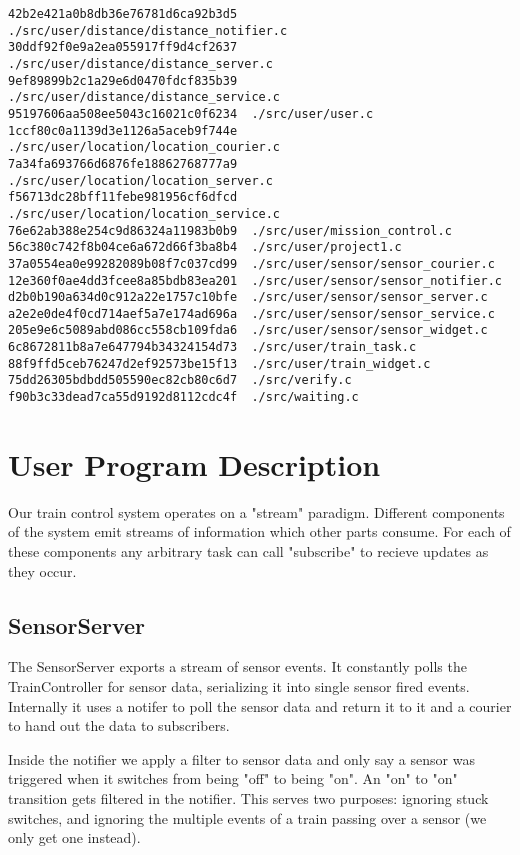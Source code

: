 \documentclass{article}
\begin{document}
\begin{verbatim}
42b2e421a0b8db36e76781d6ca92b3d5  ./src/user/distance/distance_notifier.c
30ddf92f0e9a2ea055917ff9d4cf2637  ./src/user/distance/distance_server.c
9ef89899b2c1a29e6d0470fdcf835b39  ./src/user/distance/distance_service.c
95197606aa508ee5043c16021c0f6234  ./src/user/user.c
1ccf80c0a1139d3e1126a5aceb9f744e  ./src/user/location/location_courier.c
7a34fa693766d6876fe18862768777a9  ./src/user/location/location_server.c
f56713dc28bff11febe981956cf6dfcd  ./src/user/location/location_service.c
76e62ab388e254c9d86324a11983b0b9  ./src/user/mission_control.c
56c380c742f8b04ce6a672d66f3ba8b4  ./src/user/project1.c
37a0554ea0e99282089b08f7c037cd99  ./src/user/sensor/sensor_courier.c
12e360f0ae4dd3fcee8a85bdb83ea201  ./src/user/sensor/sensor_notifier.c
d2b0b190a634d0c912a22e1757c10bfe  ./src/user/sensor/sensor_server.c
a2e2e0de4f0cd714aef5a7e174ad696a  ./src/user/sensor/sensor_service.c
205e9e6c5089abd086cc558cb109fda6  ./src/user/sensor/sensor_widget.c
6c8672811b8a7e647794b34324154d73  ./src/user/train_task.c
88f9ffd5ceb76247d2ef92573be15f13  ./src/user/train_widget.c
75dd26305bdbdd505590ec82cb80c6d7  ./src/verify.c
f90b3c33dead7ca55d9192d8112cdc4f  ./src/waiting.c
\end{verbatim}

\section{User Program Description}

Our train control system operates on a "stream" paradigm. Different components of the system emit streams of information which other parts consume. For each of these components any arbitrary task can call "subscribe" to recieve updates as they occur.

\subsection{SensorServer}

The SensorServer exports a stream of sensor events. It constantly polls the TrainController for sensor data, serializing it into single sensor fired events. Internally it uses a notifer to poll the sensor data and return it to it and a courier to hand out the data to subscribers.

Inside the notifier we apply a filter to sensor data and only say a sensor was triggered when it switches from being "off" to being "on". An "on" to "on" transition gets filtered in the notifier. This serves two purposes: ignoring stuck switches, and ignoring the multiple events of a train passing over a sensor (we only get one instead).
\end{document}
